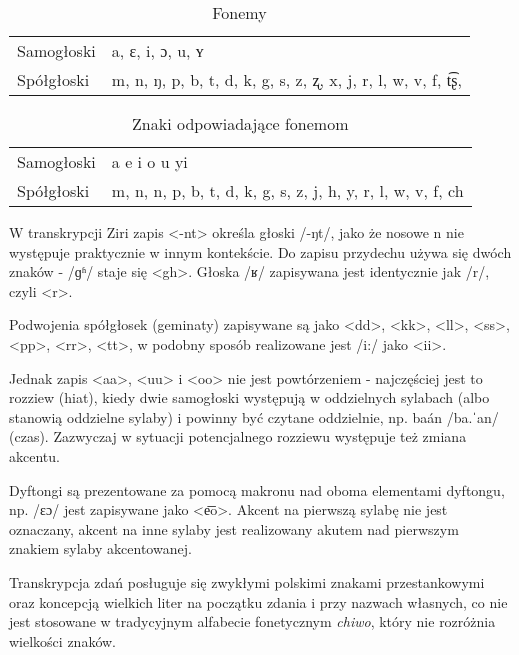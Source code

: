 \begin{table}[h]
\centering
\caption{Fonemy}
\begin{tabular}{ll}
	Samogłoski & a, ɛ, i, ɔ, u, ʏ \\
	Spółgłoski & m, n, ŋ, p, b, t, d, k, g, s, z, ʐ, x, j, r, l, w, v, f, t͡ʂ, \\
\end{tabular}
\label{tab:phonemes}
\end{table}

\begin{table}[h]
\centering
\caption{Znaki odpowiadające fonemom}
\begin{tabular}{ll}
	Samogłoski & a e i o u yi \\
	Spółgłoski & m, n, n, p, b, t, d, k, g, s, z, j, h, y, r, l, w, v, f, ch \\
\end{tabular}
\label{tab:chars}
\end{table}

W transkrypcji Ziri zapis <-nt> określa głoski /-ŋt/, jako że nosowe n nie 
występuje praktycznie w innym kontekście. Do zapisu przydechu używa się dwóch 
znaków - /ɡʱ/ staje się <gh>. Głoska /ʁ/ zapisywana jest identycznie jak /r/, 
czyli <r>.

\skipline

Podwojenia spółgłosek (geminaty) zapisywane są jako <dd>, <kk>, <ll>, <ss>, 
<pp>, <rr>, <tt>, w podobny sposób realizowane jest /i:/ jako <ii>.

Jednak zapis <aa>, <uu> i <oo> nie jest powtórzeniem - najczęściej jest to 
rozziew (hiat), kiedy dwie samogłoski występują w oddzielnych sylabach (albo 
stanowią oddzielne sylaby) i powinny być czytane oddzielnie, np. baán /ba.ˈan/
 (czas). Zazwyczaj w sytuacji potencjalnego rozziewu występuje też zmiana 
 akcentu.

Dyftongi są prezentowane za pomocą makronu nad oboma elementami dyftongu, np.
 /ɛɔ/ jest zapisywane jako <e͞o>. Akcent na pierwszą sylabę nie jest oznaczany, 
 akcent na inne sylaby jest realizowany akutem nad pierwszym znakiem sylaby 
 akcentowanej.

Transkrypcja zdań posługuje się zwykłymi polskimi znakami przestankowymi oraz 
koncepcją wielkich liter na początku zdania i przy nazwach własnych, co nie 
jest stosowane w tradycyjnym alfabecie fonetycznym \emph{chiwo}, który nie 
rozróżnia wielkości znaków.

